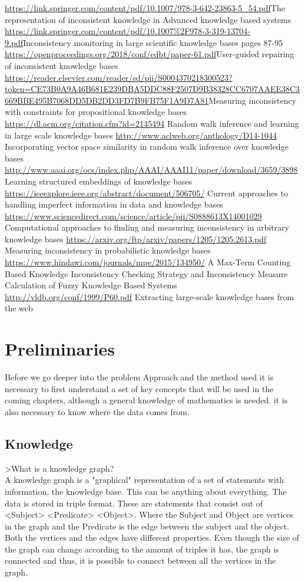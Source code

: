 \documentclass{article}
\begin{document}
\url{https://link.springer.com/content/pdf/10.1007/978-3-642-23863-5_54.pdf}The representation of inconsistent knowledge in Advanced knowledge based systems
\url{https://link.springer.com/content/pdf/10.1007%2F978-3-319-13704-9.pdf}Inconsistency monitoring in large scientific knowledge bases pages 87-95
\url{https://openproceedings.org/2018/conf/edbt/paper-61.pdf}User-guided repairing of inconsistent knowledge bases
\url{https://reader.elsevier.com/reader/sd/pii/S0004370218300523?token=CE73B0A9A46B681E239DBA5DDC88F2507D9B38328CC6707AAEE38C3669BBE495B7068DD5DB2DD3FD7B9FB75F1A9D7A81}Measuring inconsistency with constraints for propositional knowledge bases
\url{https://dl.acm.org/citation.cfm?id=2145494} Random walk inference and learning in large scale knowledge bases
\url{http://www.aclweb.org/anthology/D14-1044} Incorporating vector space similarity in random walk inference over knowledge bases
\url{http://www.aaai.org/ocs/index.php/AAAI/AAAI11/paper/download/3659/3898} Learning structured embeddings of knowledge bases
\url{https://ieeexplore.ieee.org/abstract/document/506705/} Current approaches to handling imperfect information in data and knowledge bases
\url{https://www.sciencedirect.com/science/article/pii/S0888613X14001029} Computational approaches to finding and measuring inconsistency in arbitrary knowledge bases
\url{https://arxiv.org/ftp/arxiv/papers/1205/1205.2613.pdf} Measuring inconsistency in probabilistic knowledge bases
\url{https://www.hindawi.com/journals/mpe/2015/134950/} A Max-Term Counting Based Knowledge Inconsistency Checking Strategy and Inconsistency Measure Calculation of Fuzzy Knowledge Based Systems
\url{http://vldb.org/conf/1999/P60.pdf} Extracting large-scale knowledge bases from the web


\newpage
\section{Preliminaries}
Before we go deeper into the problem Approach and the method used it is necessary to first understand a set of key concepts that will be used in the coming chapters, although a general knowledge of mathematics is needed. it is also necessary to know where the data comes from.

\subsection{Knowledge}
>What is a knowledge graph?\\
A knowledge graph is a "graphical" representation of a set of statements with information, the knowledge base. This can be anything about everything. The data is stored in triple format. These are statements that consist out of <Subject> <Predicate> <Object>. Where the Subject and Object are vertices in the graph and the Predicate is the edge between the subject and the object. Both the vertices and the edges have different properties. Even though the size of the graph can change according to the amount of triples it has, the graph is connected and thus, it is possible to connect between all the vertices in the graph. 
\end{document}
